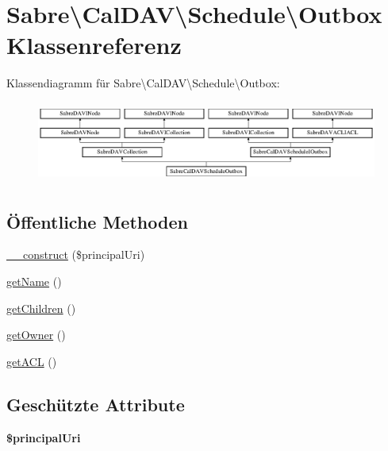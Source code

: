 \hypertarget{class_sabre_1_1_cal_d_a_v_1_1_schedule_1_1_outbox}{}\section{Sabre\textbackslash{}Cal\+D\+AV\textbackslash{}Schedule\textbackslash{}Outbox Klassenreferenz}
\label{class_sabre_1_1_cal_d_a_v_1_1_schedule_1_1_outbox}
Klassendiagramm für Sabre\textbackslash{}Cal\+D\+AV\textbackslash{}Schedule\textbackslash{}Outbox\+:\begin{figure}[H]
\begin{center}
\leavevmode
\includegraphics[height=2.692308cm]{class_sabre_1_1_cal_d_a_v_1_1_schedule_1_1_outbox}
\end{center}
\end{figure}
\subsection*{Öffentliche Methoden}
\begin{DoxyCompactItemize}
\item 
\mbox{\hyperlink{class_sabre_1_1_cal_d_a_v_1_1_schedule_1_1_outbox_af891d7fb8b26472c5b27ce4522a5456f}{\+\_\+\+\_\+construct}} (\$principal\+Uri)
\item 
\mbox{\hyperlink{class_sabre_1_1_cal_d_a_v_1_1_schedule_1_1_outbox_a34b0979bc0b38533f891556fce8ee89d}{get\+Name}} ()
\item 
\mbox{\hyperlink{class_sabre_1_1_cal_d_a_v_1_1_schedule_1_1_outbox_a08366beb598d4e73e772562cd342cba9}{get\+Children}} ()
\item 
\mbox{\hyperlink{class_sabre_1_1_cal_d_a_v_1_1_schedule_1_1_outbox_ac8cf772a8ade2c6c02c8218f0f4689f0}{get\+Owner}} ()
\item 
\mbox{\hyperlink{class_sabre_1_1_cal_d_a_v_1_1_schedule_1_1_outbox_afe3f32920f90bbb243a9f5f705548d49}{get\+A\+CL}} ()
\end{DoxyCompactItemize}
\subsection*{Geschützte Attribute}
\begin{DoxyCompactItemize}
\item 
\mbox{\label{class_sabre_1_1_cal_d_a_v_1_1_schedule_1_1_outbox_a395d51fca3e84854cabe3bc395a7419b}} 
{\bfseries \$principal\+Uri}
\end{DoxyCompactItemize}


